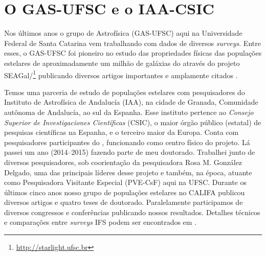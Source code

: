 \section{O GAS-UFSC e o IAA-CSIC}
\label{sec:intro:UFSCeIAA}

Nos últimos anos o grupo de Astrofísica (GAS-UFSC) aqui na Universidade Federal de Santa Catarina vem trabalhando com dados de diversos {\em surveys}. Entre esses, o GAS-UFSC foi pioneiro no estudo das propriedades físicas das populações estelares de aproximadamente um milhão de galáxias do \SDSS através do projeto SEAGal/\starlight\footnote{\href{http://starlight.ufsc.br}{http://starlight.ufsc.br}} publicando diversos artigos importantes e amplamente citados \citep[e.g., ][]{CidFernandes.etal.2005a, Mateus.etal.2006a, Stasinska.etal.2006a, Asari.etal.2007a, Stasinska.etal.2008a, CidFernandes.etal.2011a}.

Temos uma parceria de estudo de populações estelares com pesquisadores do Instituto de Astrofísica de Andalucía (IAA), na cidade de Granada, Comunidade autônoma de Andalucía, ao sul da Espanha. Esse instituto pertence ao {\em Consejo Superior de Investigaciones Científicas} (CSIC), o maior órgão público (estatal) de pesquisas científicas na Espanha, e o terceiro maior da Europa. Conta com pesquisadores participantes do \CALS, funcionando como centro físico do projeto. Lá passei um ano (2014--2015) fazendo parte de meu doutorado. Trabalhei junto de diversos pesquisadores, sob coorientação da pesquisadora Rosa M. González Delgado, uma das principais líderes desse projeto e também, na época, atuante como Pesquisadora Visitante Especial (PVE-CsF) aqui na UFSC. Durante os últimos cinco anos nosso grupo de populações estelares no CALIFA publicou diversos artigos e quatro teses de doutorado. Paralelamente participamos de diversos congressos e conferências publicando nossos resultados. Detalhes técnicos e comparações entre {\em surveys} IFS podem ser encontrados em \citet{Andre2015}.


